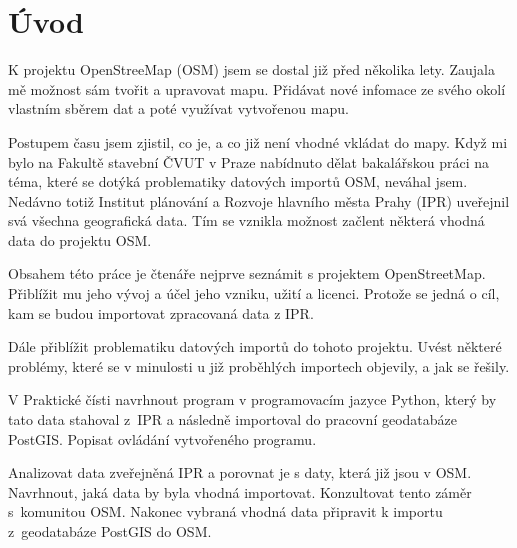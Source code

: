 \chapter{Úvod}
\label{1-uvod}


K projektu OpenStreeMap (OSM) jsem se dostal již před několika lety.
Zaujala mě možnost sám tvořit a upravovat mapu.
Přidávat nové infomace ze svého okolí vlastním sběrem dat
a poté využívat vytvořenou mapu.

Postupem času jsem zjistil, co je, a co již není vhodné vkládat do mapy.
Když mi bylo na Fakultě stavební ČVUT v Praze nabídnuto dělat
bakalářskou práci na téma, které se dotýká problematiky datových importů OSM,
neváhal jsem. Nedávno totiž Institut plánování a Rozvoje hlavního města Prahy
(IPR) uveřejnil svá všechna geografická data.
Tím se vznikla možnost začlent některá vhodná data do projektu OSM.

Obsahem této práce je čtenáře nejprve seznámit s projektem OpenStreetMap.
Přiblížit mu jeho vývoj a účel jeho vzniku, užití a licenci.
Protože se jedná o cíl, kam se budou importovat zpracovaná data z IPR.



Dále přiblížit problematiku datových importů do tohoto projektu. Uvést některé
problémy, které se v minulosti u již proběhlých importech objevily, a jak se
řešily.

V Praktické čísti navrhnout program v programovacím jazyce Python,
který by tato data stahoval z~IPR a následně importoval do pracovní geodatabáze
PostGIS. Popisat ovládání vytvořeného programu.

Analizovat data zveřejněná IPR a porovnat je s daty, která již jsou v OSM.
Navrhnout, jaká data by byla vhodná importovat.
Konzultovat tento záměr s~komunitou OSM.
Nakonec vybraná vhodná data připravit k importu z~geodatabáze PostGIS do OSM.
